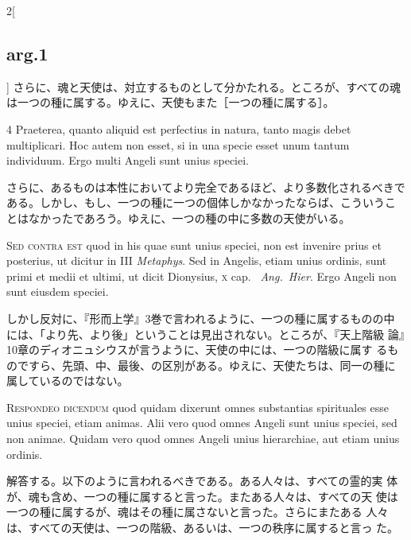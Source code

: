 \documentclass[paper=a4paper,fontsize=10pt,jafontsize=9pt,titlepage]{jlreq}
\begin{document}
\begin{paracol}{2}[\subsection{arg.1}]
さらに、魂と天使は、対立するものとして分かたれる。ところが、すべての魂
 は一つの種に属する。ゆえに、天使もまた［一つの種に属する］。


4 Praeterea, quanto aliquid est perfectius in
natura, tanto magis debet multiplicari. Hoc autem non esset, si in una
specie esset unum tantum individuum. Ergo multi Angeli sunt unius
speciei.

\switchcolumn

さらに、あるものは本性においてより完全であるほど、より多数化されるべきで
 ある。しかし、もし、一つの種に一つの個体しかなかったならば、こういうこ
 とはなかったであろう。ゆえに、一つの種の中に多数の天使がいる。

\switchcolumn*[\subsection{s.c.}]

{\scshape Sed contra est} quod in his quae sunt unius speciei, non
est invenire prius et posterius, ut dicitur in III {\itshape
Metaphys}. Sed in Angelis, etiam unius ordinis, sunt primi et medii et
ultimi, ut dicit Dionysius, {\scshape x} cap.~{\itshape
Ang.~Hier}. Ergo Angeli non sunt eiusdem speciei.

\switchcolumn

しかし反対に、『形而上学』3巻で言われるように、一つの種に属するものの中
 には、「より先、より後」ということは見出されない。ところが、『天上階級
 論』10章のディオニュシウスが言うように、天使の中には、一つの階級に属す
 るものですら、先頭、中、最後、の区別がある。ゆえに、天使たちは、同一の種に
 属しているのではない。


{\scshape Respondeo dicendum} quod quidam dixerunt omnes substantias
 spirituales esse unius speciei, etiam animas. Alii vero quod omnes
 Angeli sunt unius speciei, sed non animae. Quidam vero quod omnes
 Angeli unius hierarchiae, aut etiam unius ordinis.

\switchcolumn

解答する。以下のように言われるべきである。ある人々は、すべての霊的実
 体が、魂も含め、一つの種に属すると言った。またある人々は、すべての天
 使は一つの種に属するが、魂はその種に属さないと言った。さらにまたある
 人々は、すべての天使は、一つの階級、あるいは、一つの秩序に属すると言っ
 た。


\end{paracol}
\end{document}
